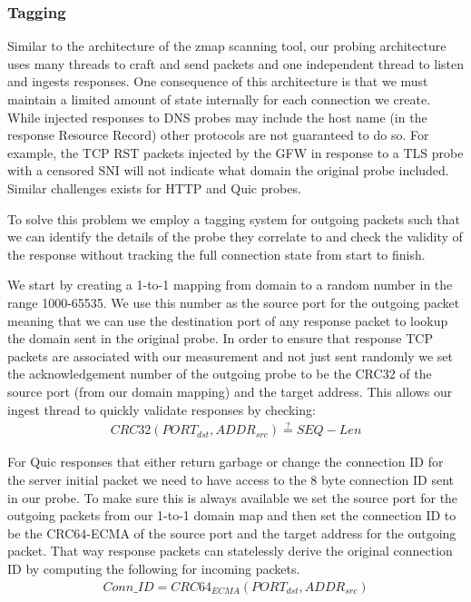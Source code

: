 \subsubsection{Tagging}

Similar to the architecture of the zmap scanning tool, our probing architecture
uses many threads to craft and send packets and one independent thread to listen
and ingests responses. One consequence of this architecture is that we must
maintain a limited amount of state internally for each connection we create.
While injected responses to DNS probes may include the host name (in the
response Resource Record) other protocols are not guaranteed to do so. For
example, the TCP RST packets injected by the GFW in response to a TLS probe with
a censored SNI will not indicate what domain the original probe included.
Similar challenges exists for HTTP and Quic probes.

To solve this problem we employ a tagging system for outgoing packets such that
we can identify the details of the probe they correlate to and check the
validity of the response without tracking the full connection state from start
to finish.

We start by creating a 1-to-1 mapping from domain to a random number in the
range 1000-65535. We use this number as the source port for the outgoing packet
meaning that we can use the destination port of any response packet to lookup
the domain sent in the original probe. In order to ensure that response TCP
packets are associated with our measurement and not just sent randomly we set
the acknowledgement number of the outgoing probe to be the CRC32 of the source
port (from our domain mapping) and the target address. This allows our ingest
thread to quickly validate responses by checking:
\begin{gather*}
CRC32(PORT_{dst},ADDR_{src}) \stackrel{?}{=} SEQ - Len
\end{gather*}

For Quic responses that either return garbage or change the connection ID for
the server initial packet we need to have access to the 8 byte connection ID
sent in our probe. To make sure this is always available we set the source port
for the outgoing packets from our 1-to-1 domain map and then set the connection
ID to be the CRC64-ECMA of the source port and the target address for the
outgoing packet. That way response packets can statelessly derive the original
connection ID by computing the following for incoming packets.
\begin{gather*}
Conn\_ID = CRC64_{ECMA}(PORT_{dst},ADDR_{src})
\end{gather*}


